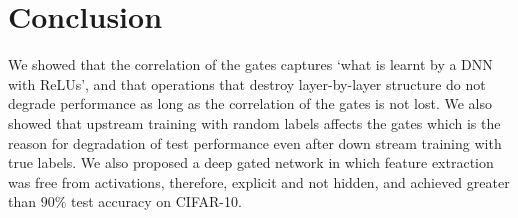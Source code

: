 \section{Conclusion}
We showed that the correlation of the gates captures `what is learnt by a DNN with ReLUs', and  that operations that destroy layer-by-layer structure do not degrade performance as long as the correlation of the gates is not lost. We also showed that upstream training with random labels affects the gates which is the reason for degradation of test performance even after down stream training with true labels. We also proposed a deep gated network in which feature extraction was free from activations, therefore, explicit and not hidden, and achieved greater than $90\%$ test accuracy on CIFAR-10.
